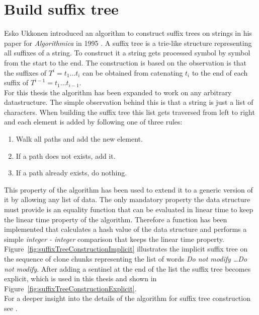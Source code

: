 \section{Build suffix tree}


Esko Ukkonen introduced an algorithm to construct suffix trees on strings in his paper for \textit{Algorithmica} in 1995 \cite{Ukkonen1995}. A suffix tree is a trie-like structure representing all suffixes of a string. To construct it a string gets processed symbol by symbol from the start to the end. The construction is based on the observation is that the suffixes of $T^i = t_1 \dots t_i$ can be obtained from catenating $t_i$ to the end of each suffix of $T^{i-1} = t_1 \dots t_{i-1}$. \cite{Ukkonen1995}\\
For this thesis the algorithm has been expanded to work on any arbitrary datastructure. The simple observation behind this is that a string is just a list of characters. When building the suffix tree this list gets traversed from left to right and each element is added by following one of three rules:
\begin{enumerate}
	\item Walk all paths and add the new element.
	\item If a path does not exists, add it.
	\item If a path already exists, do nothing.
\end{enumerate}
This property of the algorithm has been used to extend it to a generic version of it by allowing any list of data. The only mandatory property the data structure must provide is an equality function that can be evaluated in linear time to keep the linear time property of the algorithm. Therefore a function has been implemented that calculates a hash value of the data structure and performs a simple \textit{integer - integer} comparison that keeps the linear time property.\\
Figure~\ref{fig:suffixTreeConstructionImplicit} illustrates the implicit suffix tree on the sequence of clone chunks representing the list of words \textit{Do not modify \dots Do not modify}. After adding a sentinel at the end of the list the suffix tree becomes explicit, which is used in this thesis and shown in Figure~\ref{fig:suffixTreeConstructionExplicit}.\\
For a deeper insight into the details of the algorithm for suffix tree construction see \cite{Ukkonen1995}. 
